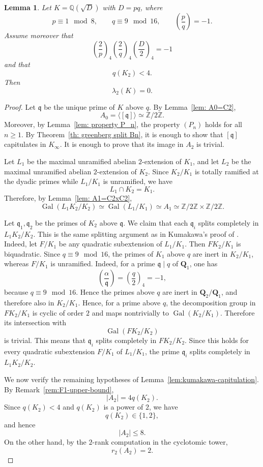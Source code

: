 \documentclass{article}
\numberwithin{equation}{section}
\theoremstyle{plain}  %
\newtheorem{lemma}{Lemma}[section]
\theoremstyle{definition}
\newcommand{\Z}{\mathbb{Z}}
\newcommand{\Q}{\mathbb{Q}}
\DeclareMathOperator{\Gal}{Gal}
\newcommand{\fk}{\mathfrak }
\begin{document}
\begin{lemma}\label{lem:q less than 4 implies lambda 0}
Let $K=\Q(\sqrt{D})$ with $D=pq$, where
$$
p\equiv 1 \mod 8,\qquad q\equiv 9 \mod{16},\qquad \left(\frac{p}{q}\right)=-1.
$$
Assume moreover that
$$
\left(\frac{2}{p}\right)_4\left(\frac{2}{q}\right)_4\left(\frac{D}{2}\right)_4=-1
$$
and that
$$
q(K_2)<4.
$$
Then
$$
\lambda_2(K)=0.
$$
\end{lemma}

\begin{proof}
Let $\fk q$ be the unique prime of $K$ above $q$. By
Lemma~\ref{lem: A0=C2},
$$
A_0=\langle[\fk q]\rangle\simeq \Z/2\Z.
$$
Moreover, by Lemma~\ref{lem: property P_n}, the property $(P_n)$ holds
for all $n\ge 1$. By Theorem~\ref{th: greenberg split Bn}, it is enough to
show that $[\fk q]$ capitulates in $K_\infty$. It is enough to prove
that its image in $A_2$ is trivial.

Let $L_1$ be the maximal unramified abelian $2$-extension of $K_1$, and
let $L_2$ be the maximal unramified abelian $2$-extension of $K_2$. Since
$K_2/K_1$ is totally ramified at the dyadic primes while $L_1/K_1$ is
unramified, we have
$$
L_1\cap K_2=K_1.
$$
Therefore, by Lemma~\ref{lem: A1=C2xC2},
$$
\Gal(L_1K_2/K_2)
\simeq
\Gal(L_1/K_1)
\simeq
A_1
\simeq
\Z/2\Z\times \Z/2\Z.
$$

Let $\fk q_1,\fk q_2$ be the primes of $K_2$ above
$\fk q$. We claim that each $\fk q_i$ splits completely in
$L_1K_2/K_2$. This is the same splitting argument as in Kumakawa's proof
of \cite[Theorem~2.1.5]{MR4262274}. Indeed, let $F/K_1$ be any quadratic
subextension of $L_1/K_1$. Then $FK_2/K_1$ is biquadratic. Since
$q\equiv 9\mod {16}$, the primes of $K_1$ above $q$ are inert in
$K_2/K_1$, whereas $F/K_1$ is unramified.  Indeed, for a prime $\fk q\mid q$ of $\mathbf Q_1$, one has
$$
\left(\frac{\alpha}{\fk q}\right)
=
\left(\frac{q}{2}\right)_4
=
-1,
$$
because $q\equiv 9\mod {16}$. Hence the primes above $q$ are inert in
$\mathbf Q_2/\mathbf Q_1$, and therefore also in $K_2/K_1$. Hence, for a prime above $q$,
the decomposition group in $FK_2/K_1$ is cyclic of order $2$ and maps
nontrivially to $\Gal(K_2/K_1)$. Therefore its intersection with
$$
\Gal(FK_2/K_2)
$$
is trivial. This means that $\fk q_i$ splits completely in
$FK_2/K_2$. Since this holds for every quadratic subextension
$F/K_1$ of $L_1/K_1$, the prime $\fk q_i$ splits completely in
$L_1K_2/K_2$.

We now verify the remaining hypotheses of
Lemma~\ref{lem:kumakawa-capitulation}. By Remark~\ref{rem:F1-upper-bound},
$$
|A_2|= 4q(K_2).
$$
Since $q(K_2)<4$ and $q(K_2)$ is a power of $2$, we have
$$
q(K_2)\in\{1,2\},
$$
and hence
$$
|A_2|\le 8.
$$
On the other hand, by the $2$-rank computation in the cyclotomic tower,
$$
r_2(A_2)=2.
$$


\end{proof}
\end{document}
